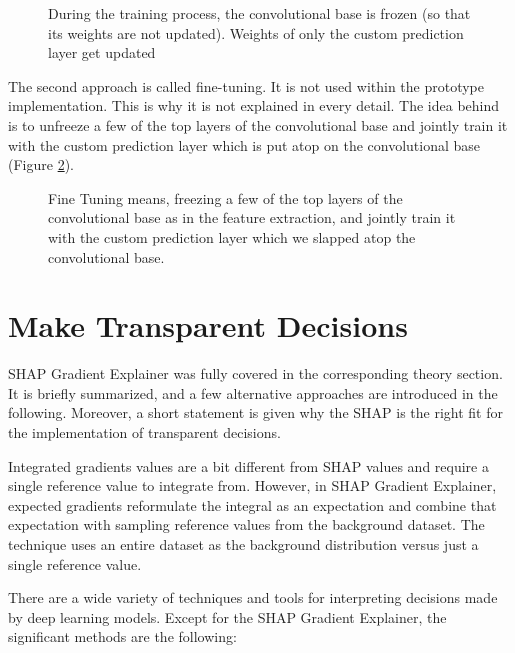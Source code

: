 \begin{figure}[htp]
	\centering
	\caption{
		During the training process, the convolutional base is frozen (so that its weights are not updated). Weights of only the custom prediction layer get updated
	}
	\label{fig:49_feature_extraction}
\end{figure}

The second approach is called fine-tuning. It is not used within the prototype implementation. This is why it is not explained in every detail. The idea behind is to unfreeze a few of the top layers of the convolutional base and jointly train it with the custom prediction layer which is put atop on the convolutional base (Figure \ref{fig:50_feature_extraction}).

\begin{figure}[htp]
	\centering
	\caption{
		Fine Tuning means, freezing a few of the top layers of the convolutional base as in the feature extraction, and jointly train it with the custom prediction layer which we slapped atop the convolutional base.
	}
	\label{fig:50_feature_extraction}
\end{figure}

\section{Make Transparent Decisions}
\label{make_transparent_decisions}

SHAP Gradient Explainer was fully covered in the corresponding theory section. It is briefly summarized, and a few alternative approaches are introduced in the following. Moreover, a short statement is given why the SHAP is the right fit for the implementation of transparent decisions.

Integrated gradients values are a bit different from SHAP values and require a single reference value to integrate from. However, in SHAP Gradient Explainer, expected gradients reformulate the integral as an expectation and combine that expectation with sampling reference values from the background dataset. The technique uses an entire dataset as the background distribution versus just a single reference value. 

There are a wide variety of techniques and tools for interpreting decisions made by deep learning models. Except for the SHAP Gradient Explainer, the significant methods are the following:

